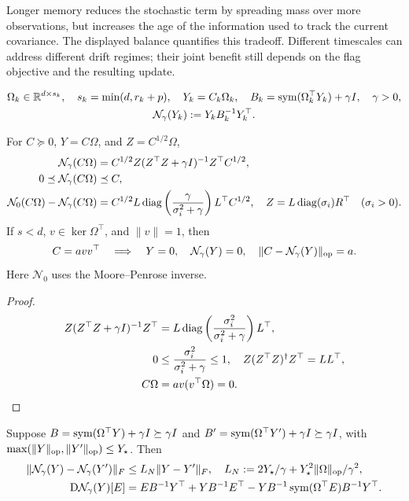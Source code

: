 Longer memory reduces the stochastic term by spreading mass over more
observations, but increases the age of the information used to track the
current covariance. The displayed balance quantifies this tradeoff. Different
timescales can address different drift regimes; their joint benefit still
depends on the flag objective and the resulting update.

\begin{definition}
\begin{gather}
 \Omega_k\in\mathbb R^{d\times s_k},\quad s_k=\min(d,r_k+p),\quad
 Y_k=C_k\Omega_k,\quad B_k=\operatorname{sym}(\Omega_k^\top Y_k)+\gamma I,\quad\gamma>0,\\
 \mathcal N_\gamma(Y_k):=Y_kB_k^{-1}Y_k^\top.
\end{gather}
\end{definition}
\begin{proposition}\label{prop:rigid-nystrom}
For $C\succeq0$, $Y=C\Omega$, and $Z=C^{1/2}\Omega$,
\begin{align}
 \mathcal N_\gamma(C\Omega)
 &=C^{1/2}Z(Z^\top Z+\gamma I)^{-1}Z^\top C^{1/2},\\
 0\preceq\mathcal N_\gamma(C\Omega)&\preceq C,\\
 \mathcal N_0(C\Omega)-\mathcal N_\gamma(C\Omega)
 &=C^{1/2}L\operatorname{diag}\left(\frac{\gamma}{\sigma_i^2+\gamma}\right)L^\top C^{1/2},
 \quad Z=L\operatorname{diag}(\sigma_i)R^\top\quad(\sigma_i>0).
\end{align}
If $s<d$, $v\in\ker\Omega^\top$, and $\|v\|=1$, then
\begin{equation}
 C=a vv^\top\quad\Longrightarrow\quad Y=0,\quad
 \mathcal N_\gamma(Y)=0,\quad\|C-\mathcal N_\gamma(Y)\|_{\mathrm{op}}=a.
\end{equation}
Here $\mathcal N_0$ uses the Moore--Penrose inverse.
\end{proposition}
\begin{proof}
\begin{align}
 Z(Z^\top Z+\gamma I)^{-1}Z^\top
 &=L\operatorname{diag}\left(\frac{\sigma_i^2}{\sigma_i^2+\gamma}\right)L^\top,\\
 0&\le\frac{\sigma_i^2}{\sigma_i^2+\gamma}\le1,\quad
 Z(Z^\top Z)^\dagger Z^\top=LL^\top,\\
 C\Omega&=av(v^\top\Omega)=0.
\end{align}
\end{proof}
\begin{lemma}\label{lem:rigid-sketch-lip}
Suppose $B=\operatorname{sym}(\Omega^\top Y)+\gamma I\succeq\gamma I$ and
$B'=\operatorname{sym}(\Omega^\top Y')+\gamma I\succeq\gamma I$, with
$\max(\|Y\|_{\mathrm{op}},\|Y'\|_{\mathrm{op}})\le Y_\star$. Then
\begin{align}
 \|\mathcal N_\gamma(Y)-\mathcal N_\gamma(Y')\|_F
 &\le L_N\|Y-Y'\|_F,\quad
 L_N:=2Y_\star/\gamma+Y_\star^2\|\Omega\|_{\mathrm{op}}/\gamma^2,\\
 \mathrm D\mathcal N_\gamma(Y)[E]
 &=EB^{-1}Y^\top+YB^{-1}E^\top
                   -YB^{-1}\operatorname{sym}(\Omega^\top E)B^{-1}Y^\top.
\end{align}
\end{lemma}
